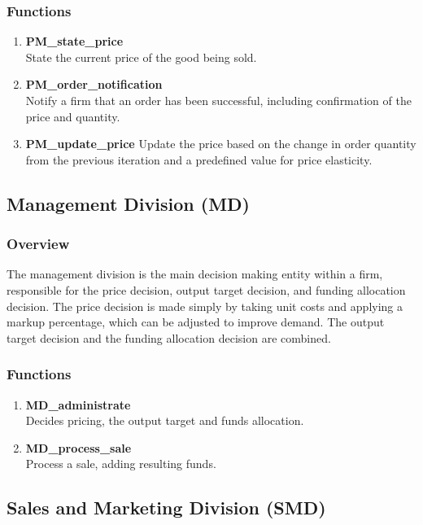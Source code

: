 \documentclass[11pt]{article}
\begin{document}
\subsubsection{Functions}
\begin{enumerate}
	\item \textbf{PM\_state\_price} \\
	State the current price of the good being sold.
	\item \textbf{PM\_order\_notification} \\
	Notify a firm that an order has been successful, including confirmation of the price and quantity.
	\item \textbf{PM\_update\_price}
	Update the price based on the change in order quantity from the previous iteration and a predefined value for price elasticity.
\end{enumerate}

\subsection{Management Division (MD)}

\subsubsection{Overview}
The management division is the main decision making entity within a firm, responsible for the price decision, output target decision, and funding allocation decision. The price decision is made simply by taking unit costs and applying a markup percentage, which can be adjusted to improve demand. The output target decision and the funding allocation decision are combined.

\subsubsection{Functions}
\begin{enumerate}
	\item \textbf{MD\_administrate} \\
	Decides pricing, the output target and funds allocation.
	\item \textbf{MD\_process\_sale} \\
	Process a sale, adding resulting funds.
\end{enumerate}

\subsection{Sales and Marketing Division (SMD)}
\end{document}
